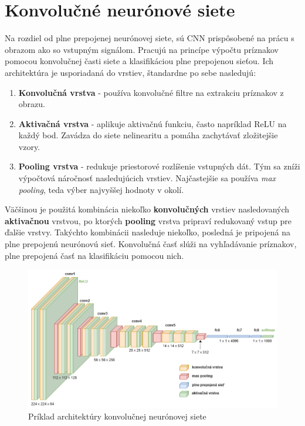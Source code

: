     \section{Konvolučné neurónové siete}

        Na rozdiel od plne prepojenej neurónovej siete, sú \ac{CNN} prispôsobené na prácu s obrazom ako so vstupným signálom. Pracujú na princípe výpočtu príznakov pomocou konvolučnej časti siete a klasifikáciou plne prepojenou sieťou. Ich architektúra je usporiadaná do vrstiev, štandardne po sebe nasledujú:

        \begin{enumerate}
            \item \textbf{Konvolučná vrstva} - používa konvolučné filtre na extrakciu príznakov z obrazu.
            \item \textbf{Aktivačná vrstva} - aplikuje aktivačnú funkciu, často napríklad \ac{ReLU} na každý bod. Zavádza do siete nelinearitu a pomáha zachytávať zložitejšie vzory.
            \item \textbf{Pooling vrstva} - redukuje priestorové rozlíšenie vstupných dát. Tým sa zníži výpočtová náročnosť nasledujúcich vrstiev. Najčastejšie sa používa \emph{max pooling}, teda výber najvyššej hodnoty v okolí.
        \end{enumerate}

        Väčšinou je použitá kombinácia niekoľko \textbf{konvolučných} vrstiev nasledovaných \textbf{aktivačnou} vrstvou, po ktorých \textbf{pooling} vrstva pripraví redukovaný vstup pre ďalšie vrstvy. Takýchto kombinácii nasleduje niekoľko, posledná je pripojená na plne prepojenú neurónovú sieť. Konvolučná časť slúži na vyhľadávanie príznakov, plne prepojená časť na klasifikáciu pomocou nich.

        \begin{figure}[h]
            \centering
            \includegraphics[width=.9\textwidth]{obrazky/cnn/cnn.png}
            \caption{Príklad architektúry konvolučnej neurónovej siete}
        \end{figure}

